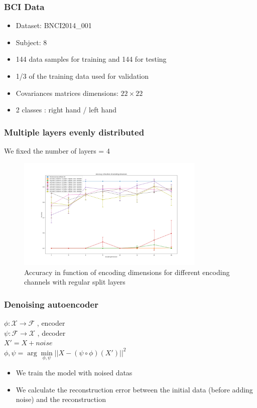 \documentclass{beamer}
\begin{document}
\begin{frame}
    \frametitle{BCI Data}
    \begin{itemize}
        \item Dataset: BNCI2014\_001
        \item Subject: 8
        \item 144 data samples for training and 144 for testing
        \item 1/3 of the training data used for validation
        \item Covariances matrices dimensions: $22 \times 22$
        \item 2 classes : right hand / left hand
    \end{itemize}
\end{frame}

\begin{frame}
    \frametitle{Multiple layers evenly distributed}
    We fixed the number of layers = 4
    \begin{figure}
        \centering
        \includegraphics[width=0.8\textwidth]{figures/acc_no_noise_regular_layers.png}
        \caption{Accuracy in function of encoding dimensions for different encoding channels with regular split layers}
    \end{figure}
\end{frame}
    

\begin{frame}
    \frametitle{Denoising autoencoder}
    \begin{center}
        $ \phi : \mathcal{X} \rightarrow \mathcal{F}$ , encoder \\
        $ \psi : \mathcal{F} \rightarrow \mathcal{X}$ , decoder \\
        $ X' = X + noise $ \\
        $ \phi,\psi = \arg \min\limits_{\phi,\psi} || X-(\psi \circ \phi)(X')||^2$ \\
    \end{center}
    \begin{itemize}
        \item We train the model with noised datas
        \item We calculate the reconstruction error between the initial data (before adding noise) and the reconstruction
    \end{itemize}

\end{frame}
\end{document}
